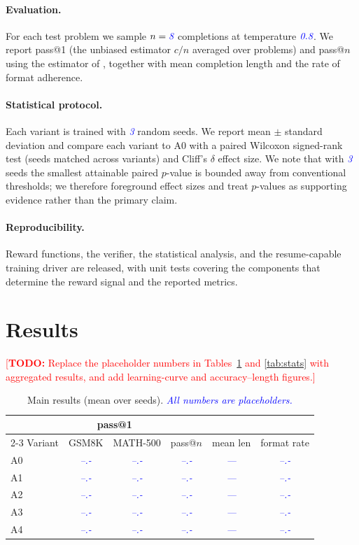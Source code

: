 \documentclass[11pt]{article}
\newcommand{\todo}[1]{\textcolor{red}{[\textbf{TODO:} #1]}}
\newcommand{\res}[1]{\textcolor{blue}{\textit{#1}}}   %
\begin{document}
\paragraph{Evaluation.}
For each test problem we sample $n=\res{8}$ completions at temperature
$\res{0.8}$. We report pass@1 (the unbiased estimator $c/n$ averaged over
problems) and pass@$n$ using the estimator of \citet{codex}, together with mean
completion length and the rate of format adherence.

\paragraph{Statistical protocol.}
Each variant is trained with \res{3} random seeds. We report mean $\pm$ standard
deviation and compare each variant to A0 with a paired Wilcoxon signed-rank test
(seeds matched across variants) and Cliff's $\delta$ effect size. We note that
with \res{3} seeds the smallest attainable paired $p$-value is bounded away from
conventional thresholds; we therefore foreground effect sizes and treat
$p$-values as supporting evidence rather than the primary claim.

\paragraph{Reproducibility.}
Reward functions, the verifier, the statistical analysis, and the resume-capable
training driver are released, with unit tests covering the components that
determine the reward signal and the reported metrics.

\section{Results}
\label{sec:results}
\todo{Replace the placeholder numbers in Tables~\ref{tab:main} and
\ref{tab:stats} with aggregated results, and add learning-curve and
accuracy--length figures.}

\begin{table}[t]
  \centering
  \caption{Main results (mean over seeds). \res{All numbers are placeholders.}}
  \label{tab:main}
  \begin{tabular}{lccccc}
    \toprule
    & \multicolumn{2}{c}{pass@1} & & & \\
    \cmidrule(lr){2-3}
    Variant & GSM8K & MATH-500 & pass@$n$ & mean len & format rate \\
    \midrule
    A0 & \res{--.-} & \res{--.-} & \res{--.-} & \res{---} & \res{--.-} \\
    A1 & \res{--.-} & \res{--.-} & \res{--.-} & \res{---} & \res{--.-} \\
    A2 & \res{--.-} & \res{--.-} & \res{--.-} & \res{---} & \res{--.-} \\
    A3 & \res{--.-} & \res{--.-} & \res{--.-} & \res{---} & \res{--.-} \\
    A4 & \res{--.-} & \res{--.-} & \res{--.-} & \res{---} & \res{--.-} \\
    \bottomrule
  \end{tabular}
\end{table}
\end{document}
